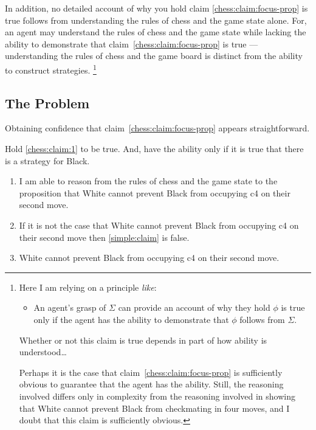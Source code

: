 \documentclass[10pt]{article}
\begin{document}
In addition, no detailed account of why you hold claim \ref{chess:claim:focus-prop} is true follows from understanding the rules of chess and the game state alone.
For, an agent may understand the rules of chess and the game state while lacking the ability to demonstrate that claim~\ref{chess:claim:focus-prop} is true --- understanding the rules of chess and the game board is distinct from the ability to construct strategies.\nolinebreak
\footnote{
  Here I am relying on a principle \emph{like}:
  \begin{itemize}
  \item An agent's grasp of \(\Sigma\) can provide an account of why they hold \(\phi\) is true only if the agent has the ability to demonstrate that \(\phi\) follows from \(\Sigma\).
  \end{itemize}
  {
    \color{red}
    Whether or not this claim is true depends in part of how ability is understood\dots
  }

  Perhaps it is the case that claim~\ref{chess:claim:focus-prop} is sufficiently obvious to guarantee that the agent has the ability.
  Still, the reasoning involved differs only in complexity from the reasoning involved in showing that White cannot prevent Black from checkmating in four moves, and I doubt that this claim is sufficiently obvious.
}

\subsection{The Problem}
\label{sec:problem-1}

Obtaining confidence that claim~\ref{chess:claim:focus-prop} appears straightforward.

Hold \ref{chess:claim:1} to be true.
And, have the ability only if it is true that there is a strategy for Black.

\begin{enumerate}
\item\label{simple:claim} I am able to reason from the rules of chess and the game state to the proposition that White cannot prevent Black from occupying c4 on their second move.
\item\label{simple:necessity} If it is not the case that White cannot prevent Black from occupying c4 on their second move then \ref{simple:claim} is false.
\item\label{simple:focus} White cannot prevent Black from occupying c4 on their second move.
\end{enumerate}
\end{document}
